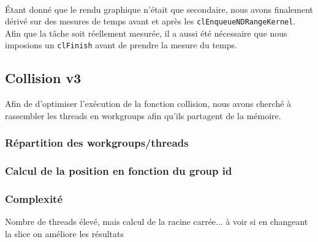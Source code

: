 \documentclass{article}
\begin{document}
\paragraph{}
Étant donné que le rendu graphique n'était que secondaire, nous avons finalement
dérivé sur des mesures de temps avant et après les
\verb!clEnqueueNDRangeKernel!. Afin que la tâche soit réellement mesurée, il
a aussi été nécessaire que nous imposions un \verb!clFinish! avant de prendre
la mesure du temps.

\subsection{Collision v3}
Afin de d'optimiser l'exécution de la fonction collision, nous avons cherché à
rassembler les threads en workgroups afin qu'ils partagent de la mémoire.

\subsubsection{Répartition des workgroups/threads}
\subsubsection{Calcul de la position en fonction du group id}
\subsubsection{Complexité}
Nombre de threads élevé, mais calcul de la racine carrée... à voir si en
changeant la slice on améliore les résultats
\end{document}
